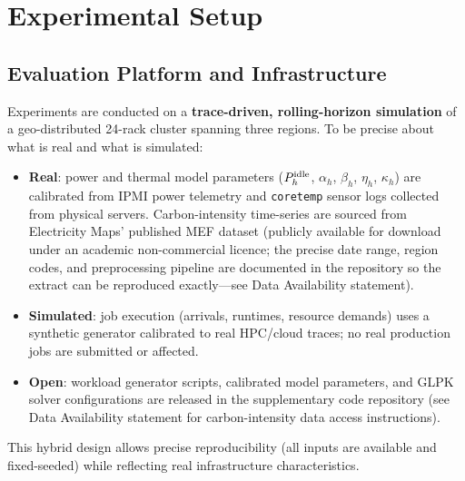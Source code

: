 \documentclass[a4paper,fleqn]{cas-dc}
\begin{document}
\section{Experimental Setup}
\label{sec:setup}

\subsection{Evaluation Platform and Infrastructure}
\label{sec:platform}

Experiments are conducted on a \textbf{trace-driven, rolling-horizon simulation} of a geo-distributed 24-rack cluster spanning three regions. To be precise about what is real and what is simulated:
\begin{itemize}
  \item \textbf{Real}: power and thermal model parameters ($P^{\rm idle}_h$, $\alpha_h$, $\beta_h$, $\eta_h$, $\kappa_h$) are calibrated from IPMI power telemetry and \texttt{coretemp} sensor logs collected from physical servers. Carbon-intensity time-series are sourced from Electricity Maps' published MEF dataset (publicly available for download under an academic non-commercial licence; the precise date range, region codes, and preprocessing pipeline are documented in the repository so the extract can be reproduced exactly---see Data Availability statement).
  \item \textbf{Simulated}: job execution (arrivals, runtimes, resource demands) uses a synthetic generator calibrated to real HPC/cloud traces; no real production jobs are submitted or affected.
  \item \textbf{Open}: workload generator scripts, calibrated model parameters, and GLPK solver configurations are released in the supplementary code repository (see Data Availability statement for carbon-intensity data access instructions).
\end{itemize}
This hybrid design allows precise reproducibility (all inputs are available and fixed-seeded) while reflecting real infrastructure characteristics.
\end{document}
